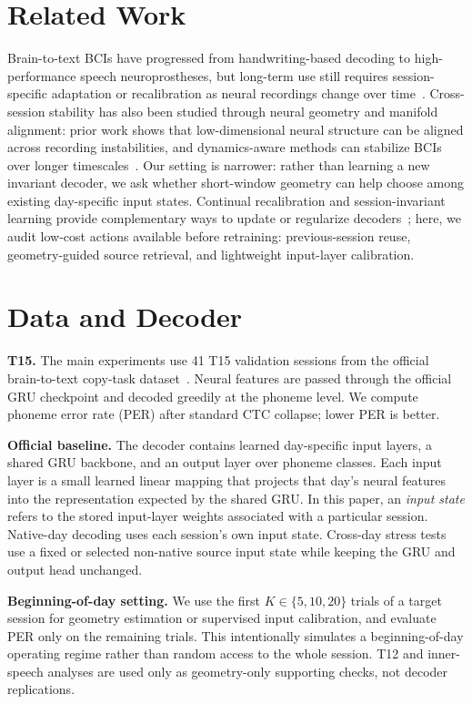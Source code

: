 \documentclass{article}
\begin{document}
\section{Related Work}
Brain-to-text BCIs have progressed from handwriting-based decoding to high-performance speech neuroprostheses, but long-term use still requires session-specific adaptation or recalibration as neural recordings change over time~\cite{willett2021handwriting,willett2023speech,card2024accurate}. Cross-session stability has also been studied through neural geometry and manifold alignment: prior work shows that low-dimensional neural structure can be aligned across recording instabilities, and dynamics-aware methods can stabilize BCIs over longer timescales~\cite{degenhart2020stabilization,karpowicz2025nomad}. Our setting is narrower: rather than learning a new invariant decoder, we ask whether short-window geometry can help choose among existing day-specific input states. Continual recalibration and session-invariant learning provide complementary ways to update or regularize decoders~\cite{fan2023corp,zhang2026align}; here, we audit low-cost actions available before retraining: previous-session reuse, geometry-guided source retrieval, and lightweight input-layer calibration.

\section{Data and Decoder}
\textbf{T15.} The main experiments use 41 T15 validation sessions from the official brain-to-text copy-task dataset~\cite{card2024accurate}. Neural features are passed through the official GRU checkpoint and decoded greedily at the phoneme level. We compute phoneme error rate (PER) after standard CTC collapse; lower PER is better.

\textbf{Official baseline.} The decoder contains learned day-specific input layers, a shared GRU backbone, and an output layer over phoneme classes. Each input layer is a small learned linear mapping that projects that day's neural features into the representation expected by the shared GRU. In this paper, an \emph{input state} refers to the stored input-layer weights associated with a particular session. Native-day decoding uses each session's own input state. Cross-day stress tests use a fixed or selected non-native source input state while keeping the GRU and output head unchanged.

\textbf{Beginning-of-day setting.} We use the first $K \in \{5,10,20\}$ trials of a target session for geometry estimation or supervised input calibration, and evaluate PER only on the remaining trials. This intentionally simulates a beginning-of-day operating regime rather than random access to the whole session. T12 and inner-speech analyses are used only as geometry-only supporting checks, not decoder replications.
\end{document}

